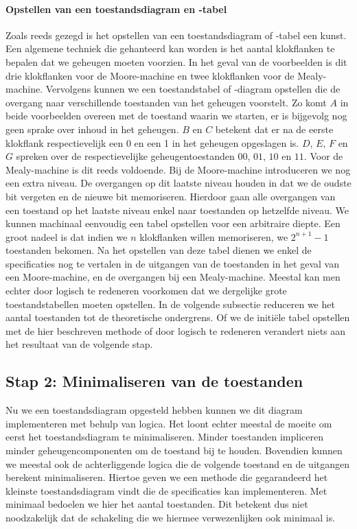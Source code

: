 \paragraph{Opstellen van een toestandsdiagram en -tabel}Zoals reeds gezegd is het opstellen van een toestandsdiagram of -tabel een kunst. Een algemene techniek die gehanteerd kan worden is het aantal klokflanken te bepalen dat we geheugen moeten voorzien.  In het geval van de voorbeelden is dit drie klokflanken voor de Moore-machine en twee klokflanken voor de Mealy-machine. Vervolgens kunnen we een toestandstabel of -diagram opstellen die de overgang naar verschillende toestanden van het geheugen voorstelt. Zo komt $A$ in beide voorbeelden overeen met de toestand waarin we starten, er is bijgevolg nog geen sprake over inhoud in het geheugen. $B$ en $C$ betekent dat er na de eerste klokflank respectievelijk een 0 en een 1 in het geheugen opgeslagen is. $D$, $E$, $F$ en $G$ spreken over de respectievelijke geheugentoestanden $00$, $01$, $10$ en $11$. Voor de Mealy-machine is dit reeds voldoende. Bij de Moore-machine introduceren we nog een extra niveau. De overgangen op dit laatste niveau houden in dat we de oudste bit vergeten en de nieuwe bit memoriseren. Hierdoor gaan alle overgangen van een toestand op het laatste niveau enkel naar toestanden op hetzelfde niveau. We kunnen machinaal eenvoudig een tabel opstellen voor een arbitraire diepte. Een groot nadeel is dat indien we $n$ klokflanken willen memoriseren, we $2^{n+1}-1$ toestanden bekomen. Na het opstellen van deze tabel dienen we enkel de specificaties nog te vertalen in de uitgangen van de toestanden in het geval van een Moore-machine, en de overgangen bij een Mealy-machine. Meestal kan men echter door logisch te redeneren voorkomen dat we dergelijke grote toestandstabellen moeten opstellen. In de volgende subsectie reduceren we het aantal toestanden tot de theoretische ondergrens. Of we de initi\"ele tabel opstellen met de hier beschreven methode of door logisch te redeneren verandert niets aan het resultaat van de volgende stap.
\subsection{Stap 2: Minimaliseren van de toestanden}
\label{ss:minimizeFSMSeq}
Nu we een toestandsdiagram opgesteld hebben kunnen we dit diagram implementeren met behulp van logica. Het loont echter meestal de moeite om eerst het toestandsdiagram te minimaliseren. Minder toestanden impliceren minder geheugencomponenten om de toestand bij te houden. Bovendien kunnen we meestal ook de achterliggende logica die de volgende toestand en de uitgangen berekent minimaliseren. Hiertoe geven we een methode die gegarandeerd het kleinste toestandsdiagram vindt die de specificaties kan implementeren. Met minimaal bedoelen we hier het aantal toestanden. Dit betekent dus niet noodzakelijk dat de schakeling die we hiermee verwezenlijken ook minimaal is.
